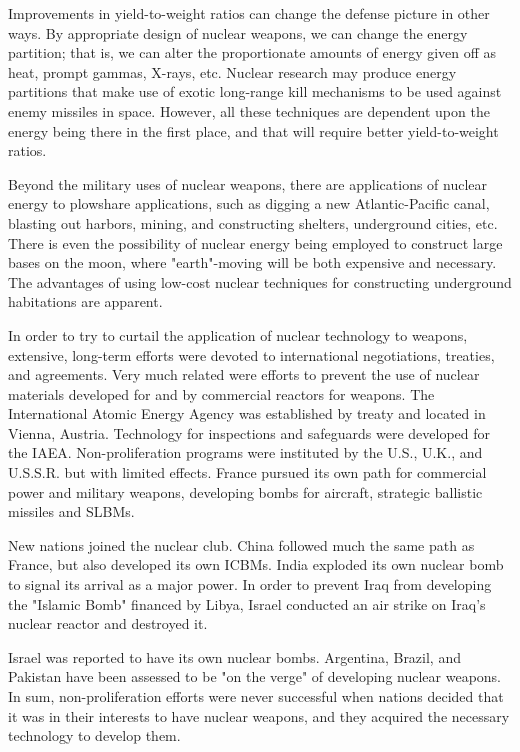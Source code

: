 Improvements in yield-to-weight ratios can change the defense picture in other ways. By appropriate design of nuclear weapons, we can change the energy partition; that is, we can alter the proportionate amounts of energy given off as heat, prompt gammas, X-rays, etc. Nuclear research may produce energy partitions that make use of exotic long-range kill mechanisms to be used against enemy missiles in space. However, all these techniques are dependent upon the energy being there in the first place, and that will require better yield-to-weight ratios.

Beyond the military uses of nuclear weapons, there are applications of nuclear energy to plowshare applications, such as digging a new Atlantic-Pacific canal, blasting out harbors, mining, and constructing shelters, underground cities, etc. There is even the possibility of nuclear energy being employed to construct large bases on the moon, where "earth"-moving will be both expensive and necessary. The advantages of using low-cost nuclear techniques for constructing underground habitations are apparent.

In order to try to curtail the application of nuclear technology to weapons, extensive, long-term efforts were devoted to international negotiations, treaties, and agreements. Very much related were efforts to prevent the use of nuclear materials developed for and by commercial reactors for weapons. The International Atomic Energy Agency was established by treaty and located in Vienna, Austria. Technology for inspections and safeguards were developed for the IAEA. Non-proliferation programs were instituted by the U.S., U.K., and U.S.S.R. but with limited effects. France pursued its own path for commercial power and military weapons, developing bombs for aircraft, strategic ballistic missiles and SLBMs.

New nations joined the nuclear club. China followed much the same path as France, but also developed its own ICBMs. India exploded its own nuclear bomb to signal its arrival as a major power. In order to prevent Iraq from developing the "Islamic Bomb" financed by Libya, Israel conducted an air strike on Iraq's nuclear reactor and destroyed it.

Israel was reported to have its own nuclear bombs. Argentina, Brazil, and Pakistan have been assessed to be "on the verge" of developing nuclear weapons. In sum, non-proliferation efforts were never successful when nations decided that it was in their interests to have nuclear weapons, and they acquired the necessary technology to develop them.

